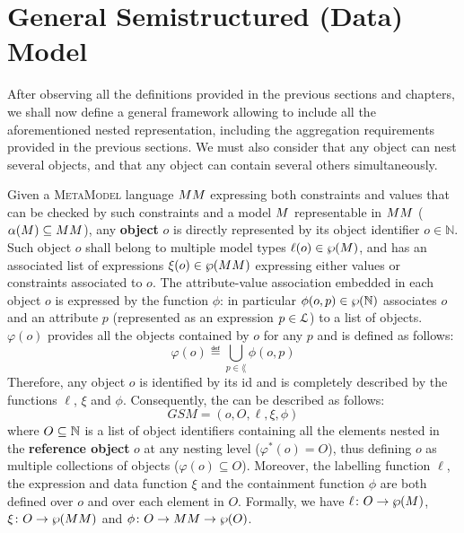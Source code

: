 
\section{General Semistructured (Data) Model}\label{def:mofgeneral}
After observing all the definitions provided in the previous sections and chapters, we shall now define a general framework allowing to include all the aforementioned nested representation, including the aggregation requirements provided in the previous sections. We must also consider that any object can nest several objects, and that any object can contain several others simultaneously. 

\begin{definition}
Given a \textsc{MetaModel}  language $\metamodel$ expressing both constraints and values that can be checked by such constraints and a model $\model$ representable in $\metamodel$ ($\abstr(\model)\subseteq\metamodel$), any \textbf{object} $o$ is directly represented by its object identifier $o\in \mathbb{N}$. Such object $o$ shall belong to multiple model types $\ell(o)\in\partof{\model}$, and has an associated list of expressions $\xi(o)\in\partof{\metamodel}$ expressing either values or constraints associated to $o$. The attribute-value association embedded in each object $o$ is expressed by the function $\phi$: in particular $\phi(o,p)\in\wp(\mathbb{N})$ associates $o$ and an attribute $p$ (represented as an expression $p\in\langg$) to a list of objects. $\varphi(o)$ provides all the objects contained by $o$ for any $p$ and is defined as follows:
\[\varphi(o)\eqdef \bigcup_{p\in\lang}\phi(o,p)\]
Therefore, any object $o$ is identified by its id and is completely described by the functions $\ell$, $\xi$ and $\phi$. Consequently, the  can be described as follows:
\[GSM=(o,O,\ell,\xi,\phi)\]
where $O\subseteq \mathbb{N}$ is a list of object identifiers containing all the elements nested in the \textbf{reference object} $o$ at any nesting level ($\varphi^*(o)=O$), thus defining $o$ as multiple collections of objects ($\varphi(o)\subseteq O$). Moreover, the labelling function $\ell$, the expression and data function $\xi$ and the containment function $\phi$ are both defined over $o$ and over each element in $O$. Formally, we have $\ell\colon O\to \partof{\model}$, $\xi\colon O\to \partof{\metamodel}$ and $\phi\colon O\to \metamodel\to\partof{O}$.

\end{definition}

